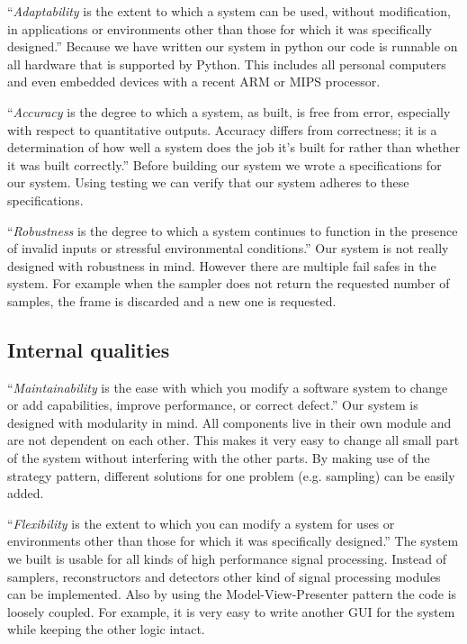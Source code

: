 \documentclass[a4paper, openany, oneside]{memoir}
\begin{document}
``\textit{Adaptability} is the extent to which a system can be used, without modification, in applications or environments other than those for which it was specifically designed.'' Because we have written our system in python our code is runnable on all hardware that is supported by Python. This includes all personal computers and even embedded devices with a recent ARM or MIPS processor.

``\textit{Accuracy} is the degree to which a system, as built, is free from error, especially with respect to quantitative outputs. Accuracy differs from correctness; it is a determination of how well a system does the job it's built for rather than whether it was built correctly.'' Before building our system we wrote a specifications for our system. Using testing we can verify that our system adheres to these specifications.

``\textit{Robustness} is the degree to which a system continues to function in the presence of invalid inputs or stressful environmental conditions.'' Our system is not really designed with robustness in mind. However there are multiple fail safes in the system. For example when the sampler does not return the requested number of samples, the frame is discarded and a new one is requested.

\subsection{Internal qualities}
``\textit{Maintainability} is the ease with which you modify a software system to change or add capabilities, improve performance, or correct defect.'' Our system is designed with modularity in mind. All components live in their own module and are not dependent on each other. This makes it very easy to change all small part of the system without interfering with the other parts. By making use of the strategy pattern, different solutions for one problem (e.g. sampling) can be easily added.

``\textit{Flexibility} is the extent to which you can modify a system for uses or environments other than those for which it was specifically designed.'' The system we built is usable for all kinds of high performance signal processing. Instead of samplers, reconstructors and detectors other kind of signal processing modules can be implemented. Also by using the Model-View-Presenter pattern the code is loosely coupled. For example, it is very easy to write another GUI for the system while keeping the other logic intact.
\end{document}
